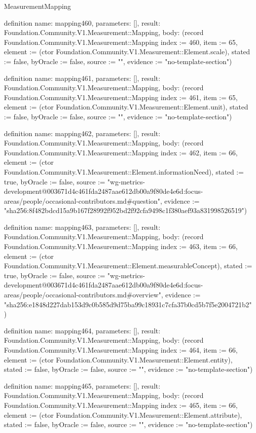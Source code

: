 \begin{lexlean}{MeasurementMapping}
\begin{semanticmodule}
definition{
  name: mapping460,
  parameters: [],
  result: Foundation.Community.V1.Measurement::Mapping,
  body: (record Foundation.Community.V1.Measurement::Mapping {index := 460, item := 65, element := (ctor Foundation.Community.V1.Measurement::Element.scale), stated := false, byOracle := false, source := "", evidence := "no-template-section"})
}

definition{
  name: mapping461,
  parameters: [],
  result: Foundation.Community.V1.Measurement::Mapping,
  body: (record Foundation.Community.V1.Measurement::Mapping {index := 461, item := 65, element := (ctor Foundation.Community.V1.Measurement::Element.unit), stated := false, byOracle := false, source := "", evidence := "no-template-section"})
}

definition{
  name: mapping462,
  parameters: [],
  result: Foundation.Community.V1.Measurement::Mapping,
  body: (record Foundation.Community.V1.Measurement::Mapping {index := 462, item := 66, element := (ctor Foundation.Community.V1.Measurement::Element.informationNeed), stated := true, byOracle := false, source := "wg-metrics-development@003671d4c461fda2487aae612db00a9f80de4e6d:focus-areas/people/occasional-contributors.md#question", evidence := "sha256:8f482bdcd15a9b167f28992f952bd2f92cfa9498c1f380aef93a831998526519"})
}

definition{
  name: mapping463,
  parameters: [],
  result: Foundation.Community.V1.Measurement::Mapping,
  body: (record Foundation.Community.V1.Measurement::Mapping {index := 463, item := 66, element := (ctor Foundation.Community.V1.Measurement::Element.measurableConcept), stated := true, byOracle := false, source := "wg-metrics-development@003671d4c461fda2487aae612db00a9f80de4e6d:focus-areas/people/occasional-contributors.md#overview", evidence := "sha256:e1848d227dab153d9c0b585d9d75ba99c18931c7cfa37b0cd5b7f5e2004721b2"})
}

definition{
  name: mapping464,
  parameters: [],
  result: Foundation.Community.V1.Measurement::Mapping,
  body: (record Foundation.Community.V1.Measurement::Mapping {index := 464, item := 66, element := (ctor Foundation.Community.V1.Measurement::Element.entity), stated := false, byOracle := false, source := "", evidence := "no-template-section"})
}

definition{
  name: mapping465,
  parameters: [],
  result: Foundation.Community.V1.Measurement::Mapping,
  body: (record Foundation.Community.V1.Measurement::Mapping {index := 465, item := 66, element := (ctor Foundation.Community.V1.Measurement::Element.attribute), stated := false, byOracle := false, source := "", evidence := "no-template-section"})
}


\end{semanticmodule}
\end{lexlean}
